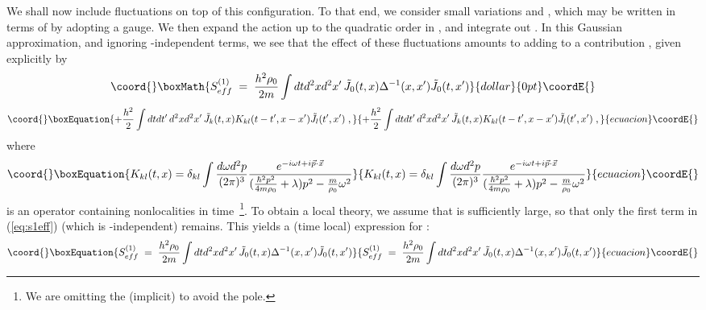 \documentclass[a4paper,12pt]{article} \tolerance=200
\begin{document}
We shall now include fluctuations on top of this configuration.  To
that end, we consider small variations \myHighlight{$\delta\rho$}\coordHE{} and \coordHE{}, which may be written in terms of \coordHE{} by adopting a
gauge. We then expand the action \coordHE{} up to the quadratic order in
\coordHE{}, and integrate out \coordHE{}. In this Gaussian
approximation, and ignoring \coordHE{}-independent terms, we see
that the effect of these fluctuations amounts to adding to
\coordHE{} a contribution \coordHE{}, given explicitly by
$$\coord{}\boxMath{
S^{(1)}_{eff}\;=\; \frac{h^2\rho_0}{2 m} \int dt d^2x d^2x'\, {\tilde J}_0(t,x) \Delta^{-1}(x,x')
{\tilde J}_0(t,x')
}{dollar}{0pt}\coordE{}$$
\begin{equation}\coord{}\boxEquation{\label{eq:s1eff}
+ \frac{h^2}{2} \int dt dt'\, d^2x d^2x'\, {\tilde J}_k (t,x)
K_{kl}(t-t',x-x') {\tilde J}_l (t',x') \;,
}{+ \frac{h^2}{2} \int dt dt'\, d^2x d^2x'\, {\tilde J}_k (t,x)
K_{kl}(t-t',x-x') {\tilde J}_l (t',x') \;,
}{ecuacion}\coordE{}\end{equation}
where
\begin{equation}\coord{}\boxEquation{\label{eq:defk}
 K_{kl}(t,x)= \delta_{kl} \int\frac{d\omega d^2p}{(2 \pi)^3}
\frac{e^{-i\omega t + i {\vec p}\cdot{\vec x}}}{(\frac{\hbar^2 p^2}{4
m \rho_0} + \lambda) p^2 - \frac{m}{\rho_0} \omega^2}
}{K_{kl}(t,x)= \delta_{kl} \int\frac{d\omega d^2p}{(2 \pi)^3}
\frac{e^{-i\omega t + i {\vec p}\cdot{\vec x}}}{(\frac{\hbar^2 p^2}{4
m \rho_0} + \lambda) p^2 - \frac{m}{\rho_0} \omega^2}
}{ecuacion}\coordE{}\end{equation}
is an operator containing nonlocalities in time~\footnote{We are
omitting the (implicit) \coordHE{} to avoid the pole.}. To
obtain a local theory, we assume that \myHighlight{$\lambda$}\coordHE{} is sufficiently large,
so that only the first term in (\ref{eq:s1eff}) (which is
\myHighlight{$\lambda$}\coordHE{}-independent) remains.  This yields a (time local) expression
for \coordHE{}:
\begin{equation}\coord{}\boxEquation{\label{eq:s2eff}
S^{(1)}_{eff}\;=\; \frac{h^2\rho_0}{2 m} \int dt d^2x d^2x'\,{\tilde
J}_0(t,x) \Delta^{-1}(x,x') {\tilde J}_0(t,x')
}{S^{(1)}_{eff}\;=\; \frac{h^2\rho_0}{2 m} \int dt d^2x d^2x'\,{\tilde
J}_0(t,x) \Delta^{-1}(x,x') {\tilde J}_0(t,x')
}{ecuacion}\coordE{}\end{equation}
\end{document}
